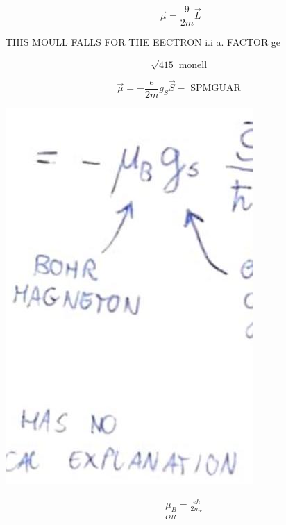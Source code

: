 \documentclass[10pt]{article}
\begin{document}
$$
\vec{\mu}=\frac{9}{2 m} \vec{L}
$$

THIS MOULL FALLS FOR THE EECTRON i.i a. FACTOR ge

$$
\sqrt{415} \text { monell }
$$

$$
\vec{\mu}=-\frac{e}{2 m} g_{S} \vec{S}-\text { SPMGUAR }
$$

\begin{center}
\includegraphics[max width=\textwidth]{2025_10_16_e34e240cf6beac2f9e0dg-2}
\end{center}

$$
\begin{aligned}
& \mu_{B}=\frac{e \hbar}{2 m_{e}} \\
& { }_{O R}
\end{aligned}
$$
\end{document}

